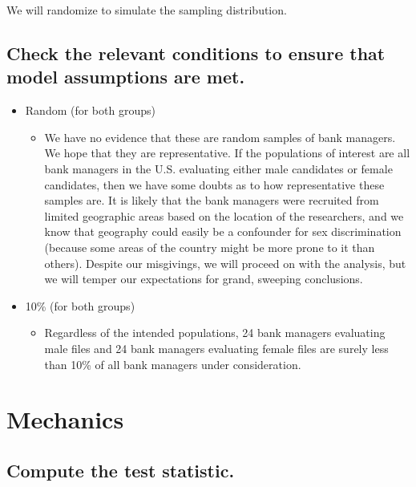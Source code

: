 \documentclass[
]{book}
\providecommand{\tightlist}{%
  \setlength{\itemsep}{0pt}\setlength{\parskip}{0pt}}
\begin{document}
We will randomize to simulate the sampling distribution.

\hypertarget{hypothesis1-ex-ht-conditions}{%
\subsection{Check the relevant conditions to ensure that model assumptions are met.}\label{hypothesis1-ex-ht-conditions}}

\begin{itemize}
\tightlist
\item
  Random (for both groups)

  \begin{itemize}
  \tightlist
  \item
    We have no evidence that these are random samples of bank managers. We hope that they are representative. If the populations of interest are all bank managers in the U.S. evaluating either male candidates or female candidates, then we have some doubts as to how representative these samples are. It is likely that the bank managers were recruited from limited geographic areas based on the location of the researchers, and we know that geography could easily be a confounder for sex discrimination (because some areas of the country might be more prone to it than others). Despite our misgivings, we will proceed on with the analysis, but we will temper our expectations for grand, sweeping conclusions.
  \end{itemize}
\item
  10\% (for both groups)

  \begin{itemize}
  \tightlist
  \item
    Regardless of the intended populations, 24 bank managers evaluating male files and 24 bank managers evaluating female files are surely less than 10\% of all bank managers under consideration.
  \end{itemize}
\end{itemize}

\hypertarget{hypothesis1-ex-mechanics}{%
\section{Mechanics}\label{hypothesis1-ex-mechanics}}

\hypertarget{hypothesis1-ex-compute-test-stat}{%
\subsection{Compute the test statistic.}\label{hypothesis1-ex-compute-test-stat}}
\end{document}
